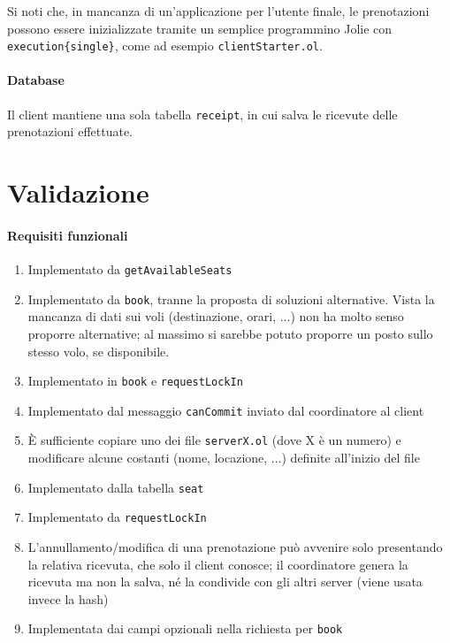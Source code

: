 \documentclass[a4paper]{article}
\begin{document}
Si noti che, in mancanza di un'applicazione per l'utente finale, le prenotazioni possono essere inizializzate tramite un semplice programmino Jolie con \texttt{execution\{single\}}, come ad esempio \texttt{clientStarter.ol}.

\paragraph{Database} Il client mantiene una sola tabella \texttt{receipt}, in cui salva le ricevute delle prenotazioni effettuate.


\section{Validazione}

\paragraph{Requisiti funzionali}
\begin{enumerate}
		\item Implementato da \texttt{getAvailableSeats}
		\item Implementato da \texttt{book}, tranne la proposta di soluzioni alternative. Vista la mancanza di dati sui voli (destinazione, orari, ...) non ha molto senso proporre alternative; al massimo si sarebbe potuto proporre un posto sullo stesso volo, se disponibile.
		\item Implementato in \texttt{book} e \texttt{requestLockIn}
		\item Implementato dal messaggio \texttt{canCommit} inviato dal coordinatore al client
		\item \`E sufficiente copiare uno dei file \texttt{serverX.ol} (dove X è un numero) e modificare alcune costanti (nome, locazione, ...) definite all'inizio del file
		\item Implementato dalla tabella \texttt{seat}
		\item Implementato da \texttt{requestLockIn}
		\item L'annullamento/modifica di una prenotazione può avvenire solo presentando la relativa ricevuta, che solo il client conosce; il coordinatore genera la ricevuta ma non la salva, né la condivide con gli altri server (viene usata invece la hash)
		\item Implementata dai campi opzionali nella richiesta per \texttt{book}
		
\end{enumerate}
\end{document}
